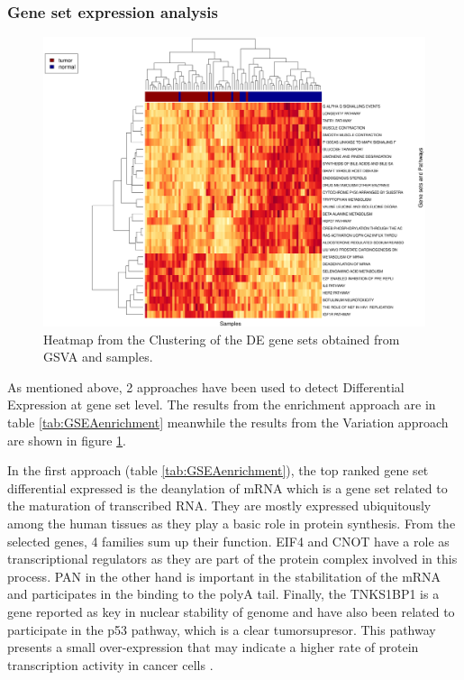 \documentclass[9pt,twocolumn,twoside]{gsajnl}
\begin{document}
\subsubsection*{Gene set expression analysis}



\begin{figure}[!h]
\centering
\includegraphics[width=1.1\textwidth]{ClusteringGSVA.eps}
\caption{Heatmap from the Clustering of the DE gene sets obtained from GSVA and samples.}
\label{fig:ClusteringGSVA}
\end{figure}


As mentioned above, 2 approaches have been used to detect Differential Expression at gene set level. The results from the enrichment approach are in table \ref{tab:GSEAenrichment} meanwhile the results from the Variation approach are shown in figure \ref{fig:ClusteringGSVA}.

In the first approach (table \ref{tab:GSEAenrichment}), the top ranked gene set differential expressed is the deanylation of mRNA which is a gene set related to the maturation of transcribed RNA. They are mostly expressed ubiquitously among the human tissues as they play a basic role in protein synthesis. From the selected genes, 4 families sum up their function. EIF4 and CNOT have a role as transcriptional regulators as they are part of the protein complex involved in this process. PAN in the other hand is important in the stabilitation of the mRNA and participates in the binding to the polyA tail. Finally, the TNKS1BP1 is a gene reported as key in nuclear stability of genome and have also been related to participate in the p53 pathway, which is a clear tumorsupresor. This pathway presents a small over-expression that may indicate a higher rate of protein transcription activity in cancer cells \cite{proteinatlas,uhlen2015tissue}.
\end{document}
